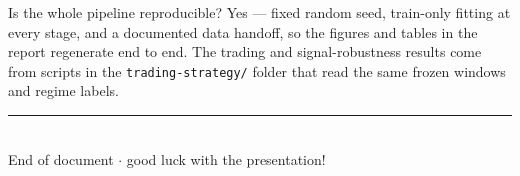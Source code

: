 \documentclass[11pt]{article}
\begin{document}
\begin{qa}{Is the whole pipeline reproducible?}
Yes --- fixed random seed, train-only fitting at every stage, and a documented
data handoff, so the figures and tables in the report regenerate end to end. The
trading and signal-robustness results come from scripts in the
\texttt{trading-strategy/} folder that read the same frozen windows and regime
labels.
\end{qa}

\vspace{10pt}
\begin{center}
{\color{rule}\rule{0.6\textwidth}{1pt}}\\[6pt]
{\sffamily\small\color{ink} End of document \;$\cdot$\; good luck with the presentation!}
\end{center}
\end{document}
